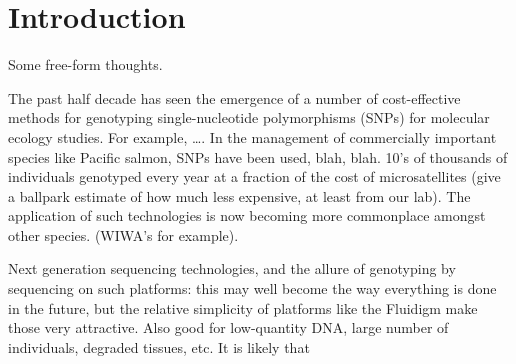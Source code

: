
\section*{Introduction}

Some free-form thoughts.

The past half decade has seen the emergence of a number of cost-effective methods for genotyping
single-nucleotide polymorphisms (SNPs) for molecular ecology studies.  For example, \ldots.
In the management of commercially important species like Pacific salmon, SNPs have been used, blah, blah.
10's of thousands of individuals genotyped every year at a fraction of the cost of microsatellites (give 
a ballpark estimate of how much less expensive, at least from our lab).  The application of such technologies 
is now becoming more commonplace amongst other species.  (WIWA's for example).  

Next generation sequencing technologies, and the allure of genotyping by sequencing on such platforms: this
may well  become the way everything is done in the future, but the relative simplicity of platforms like the 
Fluidigm make those very attractive.  Also good for low-quantity DNA, large number of individuals, degraded 
tissues, etc.  It is likely that 

 



 
